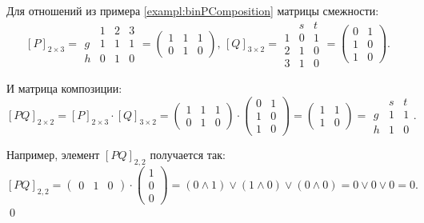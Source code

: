 \begin{exampl}
    \label{exampl:binPcompositionMatrix}
    Для отношений из примера \ref{exampl:binPComposition} матрицы смежности:
    \[
        [P]_{2\times 3}=
        \begin{array}{c|ccc}
              & 1 & 2 & 3 \\ \hline
            g & 1 & 1 & 1 \\
            h & 0 & 1 & 0
        \end{array}=
        \begin{pmatrix}
            1&1&1\\
            0&1&0
        \end{pmatrix},\,
        [Q]_{3\times 2}=
        \begin{array}{c|cc}
              & s & t \\ \hline
            1 & 0 & 1 \\
            2 & 1 & 0 \\
            3 & 1 & 0 
        \end{array}=
        \begin{pmatrix}
            0&1\\
            1&0\\
            1&0
        \end{pmatrix}.
    \]

    И матрица композиции:
    \[
        [PQ]_{2\times 2}=
        [P]_{2\times 3}\cdot [Q]_{3\times 2}=
        \begin{pmatrix}
            1&1&1\\
            0&1&0
        \end{pmatrix}\cdot
        \begin{pmatrix}
            0&1\\
            1&0\\
            1&0
        \end{pmatrix}=
        \begin{pmatrix}
            1&1\\
            1&0
        \end{pmatrix}=
        \begin{array}{c|ccc}
              & s & t \\ \hline
            g & 1 & 1 \\
            h & 1 & 0 
        \end{array}.
    \]

    Например, элемент $[PQ]_{2,2}$ получается так:
    \[
    [PQ]_{2,2}=\begin{pmatrix}0&1&0\end{pmatrix}\cdot\begin{pmatrix}1\\0\\0\end{pmatrix}=
    (0\land 1)\lor(1\land0)\lor(0\land 0)=0\lor 0\lor 0 = 0.
    \]
    \qed
\end{exampl}

